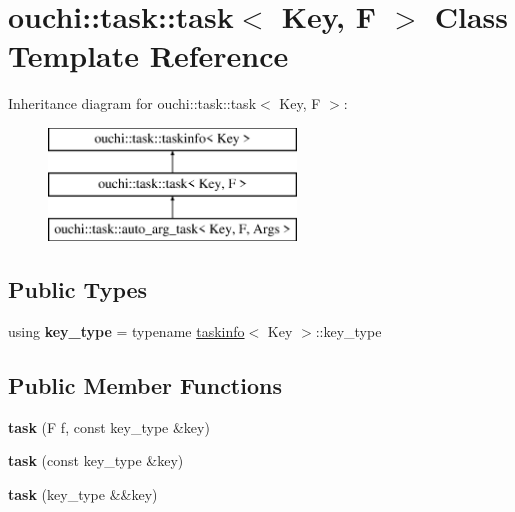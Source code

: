 \hypertarget{classouchi_1_1task_1_1task}{}\section{ouchi\+::task\+::task$<$ Key, F $>$ Class Template Reference}
\label{classouchi_1_1task_1_1task}
Inheritance diagram for ouchi\+::task\+::task$<$ Key, F $>$\+:\begin{figure}[H]
\begin{center}
\leavevmode
\includegraphics[height=3.000000cm]{classouchi_1_1task_1_1task}
\end{center}
\end{figure}
\subsection*{Public Types}
\begin{DoxyCompactItemize}
\item 
\mbox{\label{classouchi_1_1task_1_1task_a69a09a562fe73b76e86aa84cd5ba8a7b}} 
using {\bfseries key\+\_\+type} = typename \mbox{\hyperlink{classouchi_1_1task_1_1taskinfo}{taskinfo}}$<$ Key $>$\+::key\+\_\+type
\end{DoxyCompactItemize}
\subsection*{Public Member Functions}
\begin{DoxyCompactItemize}
\item 
\mbox{\label{classouchi_1_1task_1_1task_ae60a88e6659e202dfd000423d4514266}} 
{\bfseries task} (F f, const key\+\_\+type \&key)
\item 
\mbox{\label{classouchi_1_1task_1_1task_a9d5de7e536001dd8f7eea56ff6f0a041}} 
{\bfseries task} (const key\+\_\+type \&key)
\item 
\mbox{\label{classouchi_1_1task_1_1task_aeb5f95de957a55f711d856ef1f435071}} 
{\bfseries task} (key\+\_\+type \&\&key)
\end{DoxyCompactItemize}
